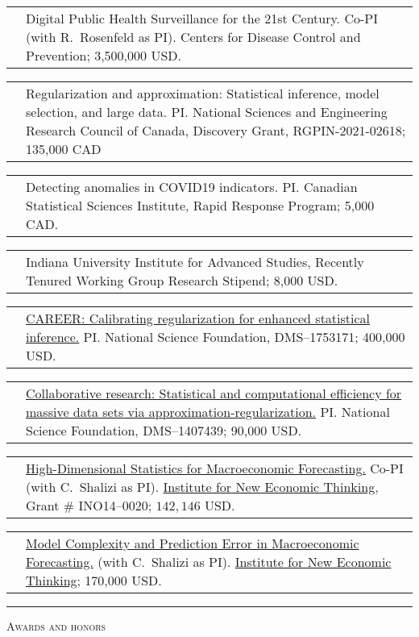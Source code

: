 \documentclass[11pt,letterpaper]{minimal/moderncv}
\makeatletter
\renewcommand{\section}[1]{  \par\addvspace{15pt}%
  \parbox[t]{\hintscolumnwidth}{\strut\raggedleft\raisebox{4pt}%
  {\rule{\hintscolumnwidth}{2pt}}}%
  \hspace{\separatorcolumnwidth}%
  \textsc{\Large #1}\par\nobreak\addvspace{6pt}%
}
\renewcommand*{\cvitem}[2]{%
  \begin{tabular}{@{}p{\hintscolumnwidth}@{\hspace{\separatorcolumnwidth}}%
    p{\maincolumnwidth}@{}}%
    \raggedleft {#1} &  {#2}%
  \end{tabular}%
}
\makeatother
\begin{document}
\cvitem{2023}{Digital Public Health Surveillance for the 21st Century. Co-PI
(with R.\ Rosenfeld as PI). Centers for Disease Control and Prevention;
3,500,000 USD.}


\cvitem{2021--2025}{Regularization and approximation: Statistical inference,
  model selection, and large data. PI. National Sciences and Engineering
  Research Council of Canada, Discovery Grant, RGPIN-2021-02618; 135,000 CAD}

\cvitem{2020--2021}{Detecting anomalies in COVID19
  indicators. PI. Canadian Statistical Sciences Institute, Rapid
  Response Program; 5,000 CAD.}

\cvitem{2019--2020}{Indiana University Institute for Advanced Studies, Recently
  Tenured Working Group Research Stipend; 8,000 USD.}

\cvitem{2018--2023}{\href{http://www.nsf.gov/awardsearch/showAward?AWD_ID=1753171}{CAREER:
  Calibrating regularization for enhanced statistical inference.}
PI. National Science Foundation, DMS--1753171; 400,000 USD.}


\cvitem{2014--2018}{\href{http://www.nsf.gov/awardsearch/showAward?AWD_ID=1407439}{Collaborative
  research: Statistical and computational efficiency for 
massive data sets via approximation-regularization.} PI. National
Science Foundation, DMS--1407439; 90,000 USD.}


\cvitem{2014--2016}{\href{https://www.ineteconomics.org/research/grants/high-dimensional-statistics-for-macroeconomic-forecasting}
{High-Dimensional Statistics for Macroeconomic Forecasting.} Co-PI (with C.\ Shalizi as PI). \href{http://ineteconomics.org}{Institute for New Economic Thinking}, Grant \# INO14--0020; $142,146$ USD.}


\cvitem{2011--2013}{\href{https://www.ineteconomics.org/research/grants/model-complexity-and-prediction-error-in-macroeconomic-forecasting} 
{Model Complexity and Prediction Error in Macroeconomic Forecasting.}
(with C.\ Shalizi as PI).
\href{http://ineteconomics.org}{Institute for New Economic
  Thinking}; 170,000 USD.}


  
\section{Awards and honors}
\end{document}
